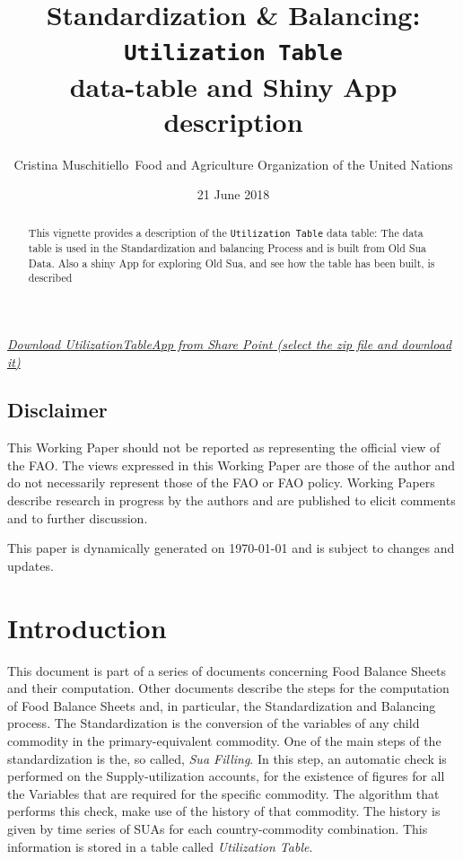 \documentclass[]{article}
\title{Standardization \& Balancing: \texttt{Utilization\ Table}\\
data-table and Shiny App description}
\author{Cristina Muschitiello~Food and Agriculture Organization of the United
Nations}
\date{21 June 2018}
\begin{document}
\maketitle
\begin{abstract}
This vignette provides a description of the \texttt{Utilization\ Table}
data table: The data table is used in the Standardization and balancing
Process and is built from Old Sua Data. Also a shiny App for exploring
Old Sua, and see how the table has been built, is described
\end{abstract}

{
\setcounter{tocdepth}{4}
\tableofcontents
}
\href{https://unfao-my.sharepoint.com/:u:/g/personal/cristina_muschitiello_fao_org/EY8G-QNTrfBBjtm-4duSCY8BT8Ebp7ODhyMqgVE4Phz77A?e=vJzHPg}{\emph{Download
UtilizationTableApp from Share Point (select the zip file and download
it)}}

\newpage

\listoftables

\listoffigures

\subsection*{Disclaimer}\label{disclaimer}

This Working Paper should not be reported as representing the official
view of the FAO. The views expressed in this Working Paper are those of
the author and do not necessarily represent those of the FAO or FAO
policy. Working Papers describe research in progress by the authors and
are published to elicit comments and to further discussion.

This paper is dynamically generated on \today{} and is subject to
changes and updates.

\newpage

\section{Introduction}\label{introduction}

This document is part of a series of documents concerning Food Balance
Sheets and their computation. Other documents describe the steps for the
computation of Food Balance Sheets and, in particular, the
Standardization and Balancing process. The Standardization is the
conversion of the variables of any child commodity in the
primary-equivalent commodity. One of the main steps of the
standardization is the, so called, \emph{Sua Filling}. In this step, an
automatic check is performed on the Supply-utilization accounts, for the
existence of figures for all the Variables that are required for the
specific commodity. The algorithm that performs this check, make use of
the history of that commodity. The history is given by time series of
SUAs for each country-commodity combination. This information is stored
in a table called \emph{Utilization Table}.
\end{document}
